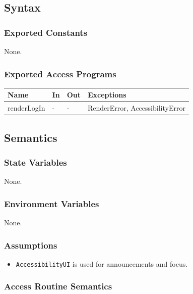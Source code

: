 \documentclass[12pt, titlepage]{article}
\begin{document}
\subsection{Syntax}

\subsubsection{Exported Constants}
None.

\subsubsection{Exported Access Programs}

\begin{center}
  \begin{tabular}{p{2.5cm} p{3cm} p{3cm} p{4cm}}
    \hline
    \textbf{Name} & \textbf{In} & \textbf{Out} & \textbf{Exceptions} \\
    \hline
    renderLogIn & - & - & RenderError, AccessibilityError \\
    \hline
  \end{tabular}
\end{center}

\subsection{Semantics}

\subsubsection{State Variables}

None.

\subsubsection{Environment Variables}

None. 

\subsubsection{Assumptions}

\begin{itemize}
  \item \texttt{AccessibilityUI} is used for announcements and focus.
\end{itemize}

\subsubsection{Access Routine Semantics}
\end{document}
